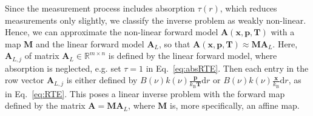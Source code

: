 Since the measurement process includes absorption $\tau(r)$, which reduces measurements only slightly, we classify the inverse problem as weakly non-linear. 
Hence, we can approximate the non-linear forward model $\bm{A}(\bm{x},  \bm{p},\bm{T})$ with a map $\bm{M}$ and the linear forward model $\bm{A}_L$, so that $\bm{A}(\bm{x},  \bm{p},\bm{T}) \approx \bm{M} \bm{A}_L $.
Here, $\bm{A}_{L,j} $ of matrix $\bm{A}_L \in \mathbb{R}^{m \times n}$ is defined by the linear forward model, where absorption is neglected, e.g. set $\tau = 1$ in Eq.~\eqref{eq:absRTE}. 
Then each entry in the row vector $\bm{A}_{L,j} $ is either defined by $ B(\nu) k(\nu)   \frac{\bm{p}}{k_{\text{B}} \bm{T}}  \text{d}r$ or $B(\nu) k(\nu)   \frac{\bm{x}}{k_{\text{B}}}  \text{d}r$, as in Eq.~\eqref{eq:RTE}.
This poses a linear inverse problem with the forward map defined by the matrix $\bm{A} = \bm{M} \bm{A}_L$, where $\bm{M}$ is, more specifically, an affine map.





